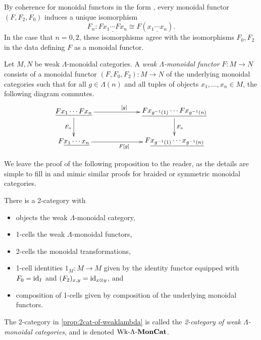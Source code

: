 \begin{nota}
By coherence for monoidal functors in the form \cite{gj-pseudo}, every monoidal functor $(F, F_2, F_0)$ induces a unique isomorphism
\[
F_n \colon \underline{Fx_1 \cdots Fx_n} \cong F(\underline{x_1 \cdots x_n}).
\]
In the case that $n=0, 2$, these isomorphisms agree with the isomorphisms $F_0, F_2$ in the data defining $F$ as a monoidal functor.
\end{nota}


\begin{Defi}\label{Defi:wk-lmf}
Let $M, N$ be weak $\Lambda$-monoidal categories. A \emph{weak $\Lambda$-monoidal functor} $F \colon M \to N$ consists of a monoidal functor $(F, F_0, F_2) \colon M \to N$ of the underlying monoidal categories such that for all $g \in \Lambda(n)$ and all tuples of objects $x_1, \ldots, x_n \in M$, the following diagram commutes.
     \[
        \xy
            (0,0)*+{\underline{Fx_1 \cdots Fx_n}}="00";
            (50,0)*+{\underline{Fx_{g^{-1}(1)} \cdots Fx_{g^{-1}(n)}}}="10";
            (0,-15)*+{F\underline{x_1 \cdots x_n}}="01";
            (50,-15)*+{F\underline{x_{g^{-1}(1)} \cdots x_{g^{-1}(n)}}}="11";
            {\ar^{[g]} "00" ; "10"};
            {\ar^{F_n} "10" ; "11"};
            {\ar_{F_n} "00" ; "01"};
            {\ar_{F[g]} "01" ; "11"};
        \endxy
     \]
\end{Defi}

We leave the proof of the following proposition to the reader, as the details are simple to fill in and mimic similar proofs for braided or symmetric monoidal categories.

\begin{prop}\label{prop:2cat-of-weaklambda}
There is a 2-category with 
\begin{itemize}
\item objects the weak $\Lambda$-monoidal category, 
\item 1-cells the weak $\Lambda$-monoidal functors,
\item 2-cells the monoidal transformations,
\item 1-cell identities $1_M \colon M \to M$ given by the identity functor equipped with $F_0 = \textrm{id}_I$ and $(F_2)_{x,y} = \textrm{id}_{x \otimes y}$,
and
\item composition of 1-cells given by composition of the underlying monoidal functors.
\end{itemize}
\end{prop}

\begin{nota}\label{nota:2cat-of-weaklambda}
The 2-category in \cref{prop:2cat-of-weaklambda} is called the \emph{2-category of weak $\Lambda$-monoidal categories}, and is denoted $\textrm{Wk}\mbox{-}\Lambda\mbox{-}\mathbf{MonCat}$.
\end{nota}

